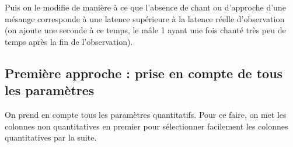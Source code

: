\documentclass[
  french,
]{article}
\newenvironment{Shaded}{\begin{snugshade}}{\end{snugshade}}
\newcommand{\ControlFlowTok}[1]{\textcolor[rgb]{0.13,0.29,0.53}{\textbf{#1}}}
\newcommand{\DecValTok}[1]{\textcolor[rgb]{0.00,0.00,0.81}{#1}}
\newcommand{\FunctionTok}[1]{\textcolor[rgb]{0.13,0.29,0.53}{\textbf{#1}}}
\newcommand{\NormalTok}[1]{#1}
\newcommand{\OtherTok}[1]{\textcolor[rgb]{0.56,0.35,0.01}{#1}}
\newcommand{\SpecialCharTok}[1]{\textcolor[rgb]{0.81,0.36,0.00}{\textbf{#1}}}
\begin{document}
Puis on le modifie de manière à ce que l'absence de chant ou d'approche
d'une mésange corresponde à une latence supérieure à la latence réelle
d'observation (on ajoute une seconde à ce temps, le mâle 1 ayant une
fois chanté très peu de temps après la fin de l'observation).

\begin{Shaded}
\end{Shaded}

\subsection{Première approche : prise en compte de tous les
paramètres}\label{premiuxe8re-approche-prise-en-compte-de-tous-les-paramuxe8tres}

On prend en compte tous les paramètres quantitatifs. Pour ce faire, on
met les colonnes non quantitatives en premier pour sélectionner
facilement les colonnes quantitatives par la suite.
\end{document}
